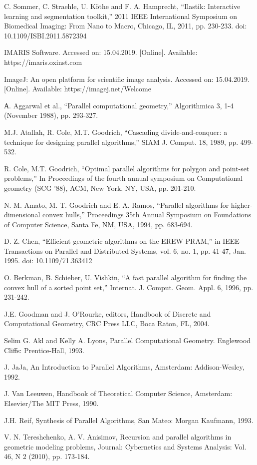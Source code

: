 \documentclass[conference]{IEEEtran}
\theoremstyle{plane}
\begin{document}
\begin{thebibliography}{00}
	 C. Sommer, C. Straehle, U. Köthe and F. A. Hamprecht, ``Ilastik: Interactive learning and segmentation toolkit,'' 2011 IEEE International Symposium on Biomedical Imaging: From Nano to Macro, Chicago, IL, 2011, pp. 230-233.
	doi: 10.1109/ISBI.2011.5872394
	
	 IMARIS Software. Accessed on: 15.04.2019. [Online]. Available: https://imaris.oxinst.com
	
	 ImageJ: An open platform for scientific image analysis. Accessed on: 15.04.2019. [Online]. Available: https://imagej.net/Welcome
	
	 А. Aggarwal et al., ``Parallel computational geometry,'' Algorithmica 3, 1-4 (November 1988), pp. 293-327.
	
	 M.J. Atallah, R. Cole, M.T. Goodrich, ``Cascading divide-and-conquer: a technique for designing parallel algorithms,'' SIAM J. Comput. 18, 1989, pp. 499-532.
	
	 R. Cole, M.T. Goodrich, ``Optimal parallel algorithms for polygon and point-set problems,'' In Proceedings of the fourth annual symposium on Computational geometry (SCG '88), ACM, New York, NY, USA, pp. 201-210.
	
	 N. M. Amato, M. T. Goodrich and E. A. Ramos, ``Parallel algorithms for higher-dimensional convex hulls,'' Proceedings 35th Annual Symposium on Foundations of Computer Science, Santa Fe, NM, USA, 1994, pp. 683-694.
	
	 D. Z. Chen, ``Efficient geometric algorithms on the EREW PRAM,'' in IEEE Transactions on Parallel and Distributed Systems, vol. 6, no. 1, pp. 41-47, Jan. 1995.
	doi: 10.1109/71.363412
	
	 O. Berkman, B. Schieber, U. Vishkin, ``A fast parallel algorithm for finding the convex hull of a sorted point set,'' Internat. J. Comput. Geom. Appl. 6, 1996, pp. 231-242.
	
	 J.E. Goodman and J. O'Rourke, editors,  Handbook of Discrete and Computational Geometry, CRC Press LLC, Boca Raton, FL, 2004.

	 Selim G. Akl and Kelly A. Lyons, Parallel Computational Geometry. Englewood Cliffs: Prentice-Hall, 1993.
	
	 J. JaJa, An Introduction to Parallel Algorithms, Amsterdam: Addison-Wesley, 1992.
	
	 J. Van Leeuwen, Handbook of Theoretical Computer Science, Amsterdam: Elsevier/The MIT
	Press, 1990.
	
	 J.H. Reif, Synthesis of Parallel Algorithms, San Mateo: Morgan Kaufmann, 1993.
	
	 V. N. Tereshchenko, A. V. Anisimov, Recursion and parallel algorithms in geometric modeling
	problems, Journal: Cybernetics and Systems Analysis: Vol. 46, N 2 (2010), pp. 173-184.
\end{thebibliography}
\end{document}
